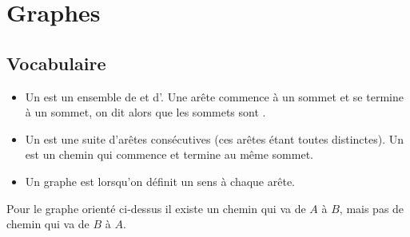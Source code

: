 \documentclass[11pt,class=report,crop=false]{standalone}
\begin{document}

%
%
%





\section{Graphes}

\subsection{Vocabulaire}

\begin{itemize}
	\item Un  est un ensemble de  et d'. Une arête commence à un sommet et se termine à un sommet, on dit alors que les sommets sont .	
	

	\item Un  est une suite d'arêtes consécutives (ces arêtes étant toutes distinctes). Un  est un chemin qui commence et termine au même sommet.
	
	\item Un graphe est  lorsqu'on définit un sens à chaque arête.
	
\end{itemize}





Pour le graphe orienté ci-dessus il existe un chemin qui va de $A$ à $B$, mais pas de chemin qui va de $B$ à $A$.
\end{document}
